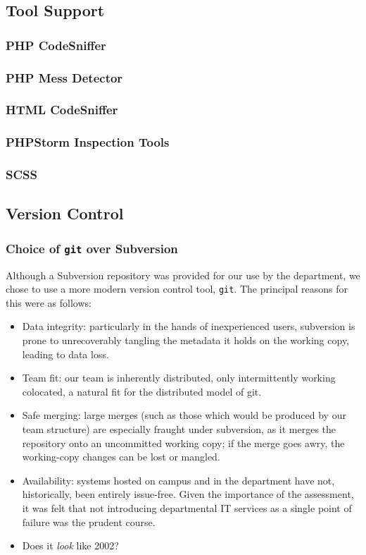 \subsection{Tool Support}

\subsubsection{PHP CodeSniffer}

\subsubsection{PHP Mess Detector}

\subsubsection{HTML CodeSniffer}

\subsubsection{PHPStorm Inspection Tools}

\subsubsection{SCSS}

\subsection{Version Control}

\subsubsection{Choice of \texttt{git} over Subversion}

Although a Subversion repository was provided for our use by the
department, we chose to use a more modern version control tool,
\texttt{git}. The principal reasons for this were as follows:

\begin{itemize}
\item Data integrity: particularly in the hands of inexperienced
  users, subversion is prone to unrecoverably tangling the metadata it
  holds on the working copy, leading to data loss.
\item Team fit: our team is inherently distributed, only
  intermittently working colocated, a natural fit for the distributed
  model of git.
\item Safe merging: large merges (such as those which would be
  produced by our team structure) are especially fraught under
  subversion, as it merges the repository onto an uncommitted working
  copy; if the merge goes awry, the working-copy changes can be lost
  or mangled.
\item Availability: systems hosted on campus and in the department
  have not, historically, been entirely issue-free. Given the
  importance of the assessment, it was felt that not introducing
  departmental IT services as a single point of failure was the
  prudent course.
\item Does it \textit{look} like 2002?
\end{itemize}

